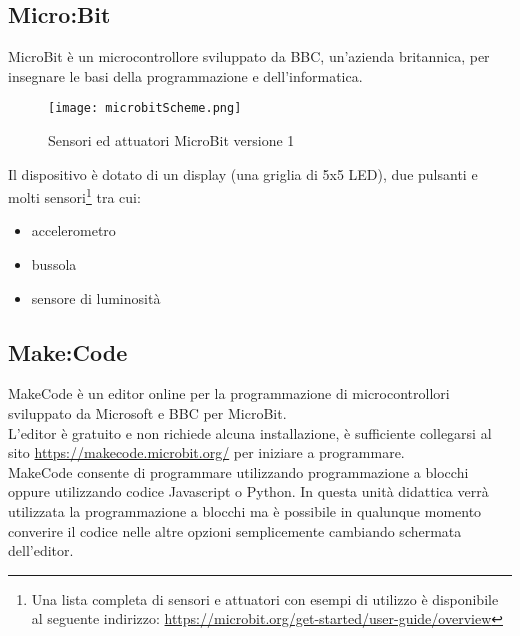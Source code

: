 \documentclass[../../docenti.tex]{subfiles}
\begin{document}
\newpage
\subsection{Micro:Bit}
 MicroBit è un microcontrollore sviluppato da BBC, un'azienda britannica, per insegnare le basi della programmazione e dell'informatica.

\begin{figure}[H]
 	\centering
 	\texttt{[image: microbitScheme.png]}
 	\caption{Sensori ed attuatori MicroBit versione 1 \parencite{MicrobitOverview}}
 	\label{fig:microbit}
\end{figure}

Il dispositivo è dotato di un display (una griglia di 5x5 LED), due pulsanti e molti sensori\footnote{Una lista completa di sensori e attuatori con esempi di utilizzo è disponibile al seguente indirizzo: \url{https://microbit.org/get-started/user-guide/overview}} tra cui:
\begin{itemize}
	\item accelerometro
	\item bussola
	\item sensore di luminosità
\end{itemize}

\subsection{Make:Code}
MakeCode è un editor online per la programmazione di microcontrollori sviluppato da Microsoft e BBC per MicroBit.\\
L'editor è gratuito e non richiede alcuna installazione, è sufficiente collegarsi al sito \url{https://makecode.microbit.org/} per iniziare a programmare.\\

MakeCode consente di programmare utilizzando programmazione a blocchi oppure utilizzando codice Javascript o Python. In questa unità didattica verrà utilizzata la programmazione a blocchi ma è possibile in qualunque momento converire il codice nelle altre opzioni semplicemente cambiando schermata dell'editor.
\end{document}
